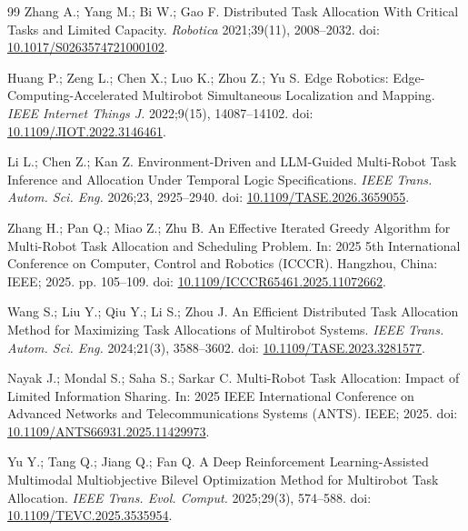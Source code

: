 \documentclass[type=submission,name=IR]{oae}
\begin{document}
\begin{thebibliography}{99}
Zhang A.; Yang M.; Bi W.; Gao F.
Distributed Task Allocation With Critical Tasks and Limited Capacity.
\textit{Robotica} 2021;39(11), 2008--2032.
doi: \href{https://doi.org/10.1017/S0263574721000102}{10.1017/S0263574721000102}.

Huang P.; Zeng L.; Chen X.; Luo K.; Zhou Z.; Yu S.
Edge Robotics: Edge-Computing-Accelerated Multirobot Simultaneous Localization and Mapping.
\textit{IEEE Internet Things J.} 2022;9(15), 14087--14102.
doi: \href{https://doi.org/10.1109/JIOT.2022.3146461}{10.1109/JIOT.2022.3146461}.

Li L.; Chen Z.; Kan Z.
Environment-Driven and LLM-Guided Multi-Robot Task Inference and Allocation Under Temporal Logic Specifications.
\textit{IEEE Trans. Autom. Sci. Eng.} 2026;23, 2925--2940.
doi: \href{https://doi.org/10.1109/TASE.2026.3659055}{10.1109/TASE.2026.3659055}.

Zhang H.; Pan Q.; Miao Z.; Zhu B.
An Effective Iterated Greedy Algorithm for Multi-Robot Task Allocation and Scheduling Problem.
In: 2025 5th International Conference on Computer, Control and Robotics (ICCCR). Hangzhou, China: IEEE; 2025. pp. 105--109.
doi: \href{https://doi.org/10.1109/ICCCR65461.2025.11072662}{10.1109/ICCCR65461.2025.11072662}.

Wang S.; Liu Y.; Qiu Y.; Li S.; Zhou J.
An Efficient Distributed Task Allocation Method for Maximizing Task Allocations of Multirobot Systems.
\textit{IEEE Trans. Autom. Sci. Eng.} 2024;21(3), 3588--3602.
doi: \href{https://doi.org/10.1109/TASE.2023.3281577}{10.1109/TASE.2023.3281577}.

Nayak J.; Mondal S.; Saha S.; Sarkar C.
Multi-Robot Task Allocation: Impact of Limited Information Sharing.
In: 2025 IEEE International Conference on Advanced Networks and Telecommunications Systems (ANTS). IEEE; 2025.
doi: \href{https://doi.org/10.1109/ANTS66931.2025.11429973}{10.1109/ANTS66931.2025.11429973}.

Yu Y.; Tang Q.; Jiang Q.; Fan Q.
A Deep Reinforcement Learning-Assisted Multimodal Multiobjective Bilevel Optimization Method for Multirobot Task Allocation.
\textit{IEEE Trans. Evol. Comput.} 2025;29(3), 574--588.
doi: \href{https://doi.org/10.1109/TEVC.2025.3535954}{10.1109/TEVC.2025.3535954}.


\end{thebibliography}
\end{document}
